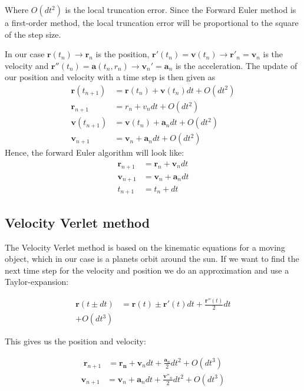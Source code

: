 \documentclass{article}
\begin{document}
Where $O(dt^2)$ is the local truncation error. Since the Forward Euler method is a first-order method, the local truncation error will be proportional to the square of the step size.

In our case $\mathbf{r}(t_n) \rightarrow \mathbf{r}_n$ is the position, $\mathbf{r}'(t_n)=\mathbf{v}(t_n) \rightarrow \mathbf{r}'_n=\mathbf{v}_n$ is the velocity and $\mathbf{r}''(t_n)=\mathbf{a}(t_n,r_n) \rightarrow \mathbf{v}_n'=\mathbf{a}_n$ is the acceleration. The update of our position and velocity with a  time step is then given as  
\begin{align*}
    \mathbf{r}(t_{n+1})&=\mathbf{r}(t_n) + \mathbf{v}(t_n)dt + O(dt^2)\\
    \mathbf{r}_{n+1}&=r_{n} + v_{n}dt + O(dt^2)\\
    \mathbf{v}(t_{n+1})&=\mathbf{v}(t_n)+\mathbf{a}_ndt + O(dt^2)\\
    \mathbf{v}_{n+1}&=\mathbf{v}_n +\mathbf{a}_n dt + O(dt^2)
\end{align*}
Hence, the forward Euler algorithm will look like:
\begin{align*}
    \mathbf{r}_{n+1}&=\mathbf{r}_n+\mathbf{v}_ndt\\
    \mathbf{v}_{n+1}&=\mathbf{v}_n+\mathbf{a}_ndt\\
    t_{n+1}&=t_n + dt
\end{align*}

\subsection{Velocity Verlet method}
The Velocity Verlet method is based on the kinematic equations for a moving object, which in our case is a planets orbit around the sun. If we want to find the next time step for the velocity and position we do an approximation and use a Taylor-expansion:    

\begin{align*}
\mathbf{r}(t\pm dt)&=\mathbf{r}(t)\pm \mathbf{r}'(t)dt + \frac{\mathbf{r}''(t)}{2}dt\\ + O(dt^3)
\end{align*}

This gives us the position and velocity:

\begin{align}
    \mathbf{r}_{n+1}&=\mathbf{r_n}+\mathbf{v}_n dt + \frac{\mathbf{a}_n}{2}dt^2+O(dt^3)
    \label{eq:r_n+1}
    \end{align}
    \begin{align}
    \mathbf{v}_{n+1}&=\mathbf{v}_n+\mathbf{a}_ndt+\frac{\mathbf{v}''_n}{2}dt^2 + O(dt^3)
     \label{eq:v_n+1}
\end{align}
\end{document}
